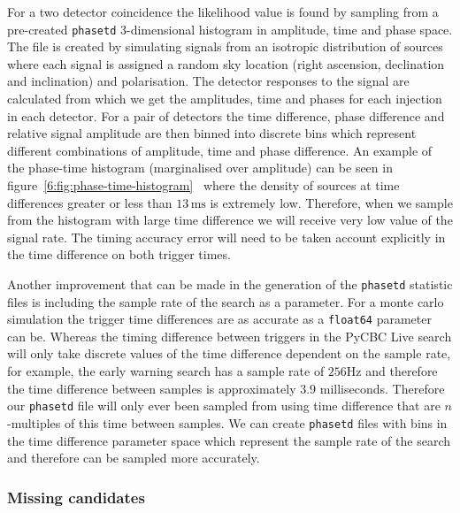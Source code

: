 For a two detector coincidence the likelihood value is found by sampling from a pre-created \texttt{phasetd} 3-dimensional histogram in amplitude, time and phase space. The file is created by simulating \gwadj signals from an isotropic distribution of sources where each signal is assigned a random sky location (right ascension, declination and inclination) and polarisation. The detector responses to the signal are calculated from which we get the amplitudes, time and phases for each injection in each detector. For a pair of detectors the time difference, phase difference and relative signal amplitude are then binned into discrete bins which represent different combinations of amplitude, time and phase difference. An example of the phase-time histogram (marginalised over amplitude) can be seen in figure~\ref{6:fig:phase-time-histogram}~\cite{PyCBC:2017} where the density of sources at time differences greater or less than $13 \, \text{ms}$ is extremely low. Therefore, when we sample from the histogram with large time difference we will receive very low value of the signal rate. The timing accuracy error will need to be taken account explicitly in the time difference on both trigger times.

Another improvement that can be made in the generation of the \texttt{phasetd} statistic files is including the sample rate of the search as a parameter. For a monte carlo simulation the trigger time differences are as accurate as a \texttt{float64} parameter can be. Whereas the timing difference between triggers in the PyCBC Live search will only take discrete values of the time difference dependent on the sample rate, for example, the early warning search has a sample rate of $256$Hz and therefore the time difference between samples is approximately $3.9$ milliseconds. Therefore our \texttt{phasetd} file will only ever been sampled from using time difference that are $n$-multiples of this time between samples. We can create \texttt{phasetd} files with bins in the time difference parameter space which represent the sample rate of the search and therefore can be sampled more accurately.

\subsubsection{\label{6:sec:missing-cands}Missing candidates}

